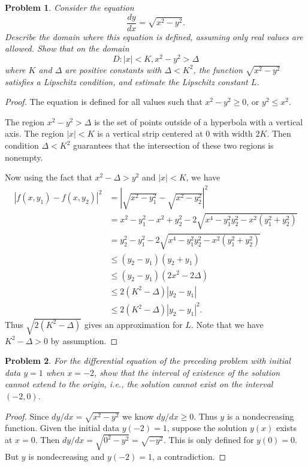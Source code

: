 \documentclass{article}
\newtheorem{problem}{Problem}
\begin{document}
\begin{problem}
Consider the equation
\[
\frac{dy}{dx} = \sqrt{x^2 - y^2}.
\]
Describe the domain where this equation is defined, assuming only real values are allowed. Show that on the domain
\[
D : |x| < K, x^2 - y^2 > \Delta
\]
where $K$ and $\Delta$ are positive constants with $\Delta < K^2$, the function $\sqrt{x^2 - y^2}$ satisfies a Lipschitz condition, and estimate the Lipschitz constant $L$.
\end{problem}
\begin{proof}
The equation is defined for all values such that $x^2 - y^2 \geq 0$, or $y^2 \leq x^2$.

The region $x^2 - y^2 > \Delta$ is the set of points outside of a hyperbola with a vertical axis. The region $|x| < K$ is a vertical strip centered at $0$ with width $2K$. Then condition $\Delta < K^2$ guarantees that the intersection of these two regions is nonempty.

Now using the fact that $x^2 - \Delta > y^2$ and $|x| < K$, we have
\begin{align*}
|f(x,y_1) - f(x,y_2)|^2
&= \left | \sqrt{x^2 - y_1^2} - \sqrt{x^2 - y_2^2} \right |^2\\
&= x^2 - y_1^2 - x^2 + y_2^2 - 2\sqrt{x^4 - y_1^2y_2^2 - x^2(y_1^2 + y_2^2)}\\
&= y_2^2 - y_1^2 - 2\sqrt{x^4 - y_1^2y_2^2 - x^2(y_1^2 + y_2^2)}\\
&\leq (y_2 - y_1)(y_2 + y_1)\\
&\leq (y_2 - y_1)(2x^2 - 2\Delta)\\
&\leq 2(K^2 - \Delta)|y_2 - y_1|\\
&\leq 2(K^2 - \Delta)|y_2 - y_1|^2.
\end{align*}
Thus $\sqrt{2(K^2 - \Delta)}$ gives an approximation for $L$. Note that we have $K^2 - \Delta > 0$ by assumption.
\end{proof}

\begin{problem}
For the differential equation of the preceding problem with initial data $y = 1$ when $x = -2$, show that the interval of existence of the solution cannot extend to the origin, i.e., the solution cannot exist on the interval $(-2,0)$.
\end{problem}
\begin{proof}
Since $dy/dx = \sqrt{x^2 - y^2}$ we know $dy/dx \geq 0$. Thus $y$ is a nondecreasing function. Given the initial data $y(-2) = 1$, suppose the solution $y(x)$ exists at $x = 0$. Then $dy/dx = \sqrt{0^2 - y^2} = \sqrt{-y^2}$. This is only defined for $y(0) = 0$. But $y$ is nondecreasing and $y(-2) = 1$, a contradiction.
\end{proof}
\end{document}
